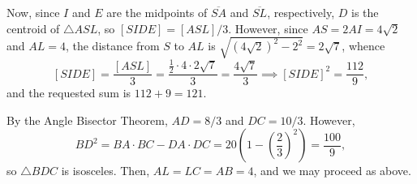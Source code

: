 Now, since $I$ and $E$ are the midpoints of $\overline{SA}$ and $\overline{SL}$, respectively, $D$ is the centroid of $\triangle ASL$, so $[SIDE]=[ASL]/3$. However, since $AS=2AI=4\sqrt2$ and $AL=4$, the distance from $S$ to $AL$ is $\sqrt{(4\sqrt2)^2-2^2}=2\sqrt7$, whence \[[SIDE]=\frac{[ASL]}3=\frac{\frac12\cdot 4\cdot 2\sqrt7}3=\frac{4\sqrt7}3\implies [SIDE]^2=\frac{112}9,\]
and the requested sum is $112+9=121$.\\

\begin{boxremark}
    By the Angle Bisector Theorem, $AD=8/3$ and $DC=10/3$. However, \[BD^2=BA\cdot BC-DA\cdot DC=20\left(1-\left(\frac23\right)^2\right)=\frac{100}9,\]
    so $\triangle BDC$ is isosceles. Then, $AL=LC=AB=4$, and we may proceed as above.
\end{boxremark}
